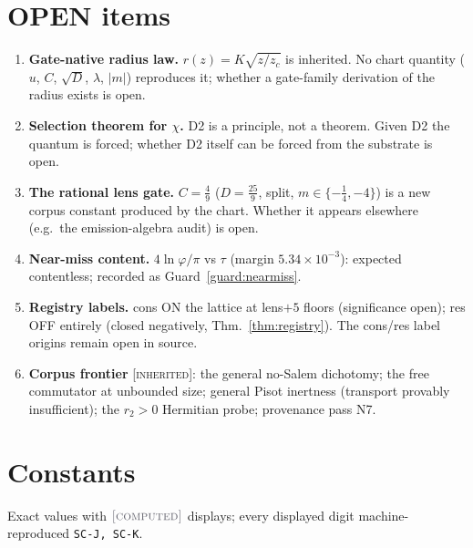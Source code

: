 \documentclass[11pt]{article}
\newcommand{\tagC}{\textcolor{cC}{\textsc{[computed]}}}
\newcommand{\tagI}{\textcolor{cI}{\textsc{[inherited]}}}
\newcommand{\hx}[1]{\textcolor{cC}{\footnotesize\texttt{#1}}}
\newcommand{\gp}{\varphi}
\theoremstyle{plain}
\theoremstyle{definition}
\theoremstyle{remark}
\begin{document}
\section{OPEN items}\label{sec:open}
\begin{enumerate}[nosep]
\item \textbf{Gate-native radius law.} $r(z)=K\sqrt{z/z_c}$ is inherited. No chart
quantity ($u$, $C$, $\sqrt D$, $\lambda$, $|m|$) reproduces it; whether a gate-family
derivation of the radius exists is open.
\item \textbf{Selection theorem for $\chi$.} D2 is a principle, not a theorem. Given
D2 the quantum is forced; whether D2 itself can be forced from the substrate is open.
\item \textbf{The rational lens gate.} $C=\tfrac49$ ($D=\tfrac{25}9$, split,
$m\in\{-\tfrac14,-4\}$) is a new corpus constant produced by the chart. Whether it
appears elsewhere (e.g.\ the emission-algebra audit) is open.
\item \textbf{Near-miss content.} $4\ln\gp/\pi$ vs $\tau$ (margin
$5.34\times10^{-3}$): expected contentless; recorded as Guard~\ref{guard:nearmiss}.
\item \textbf{Registry labels.} cons ON the lattice at lens$+5$ floors (significance
open); res OFF entirely (closed negatively, Thm.~\ref{thm:registry}). The cons/res
label origins remain open in source.
\item \textbf{Corpus frontier} \tagI{}: the general no-Salem dichotomy; the free
commutator at unbounded size; general Pisot inertness (transport provably
insufficient); the $r_2>0$ Hermitian probe; provenance pass N7.
\end{enumerate}

\section{Constants}\label{sec:constants}
Exact values with $\tagC{}$ displays; every displayed digit machine-reproduced
\hx{SC-J, SC-K}.
\end{document}
